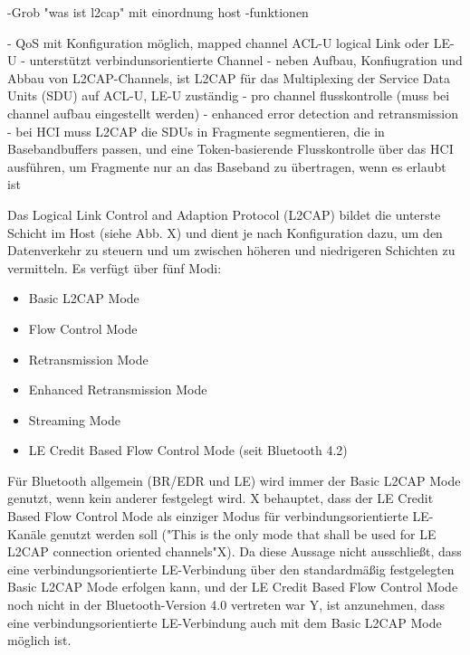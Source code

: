 -Grob "was ist l2cap" mit einordnung host
-funktionen

- QoS mit Konfiguration möglich, mapped channel ACL-U logical Link oder LE-U
- unterstützt verbindunsorientierte Channel
- neben Aufbau, Konfiugration und Abbau von L2CAP-Channels, ist L2CAP für das Multiplexing der Service Data Units (SDU) auf ACL-U, LE-U zuständig
- pro channel flusskontrolle (muss bei channel aufbau eingestellt werden)
- enhanced error detection and retransmission
- bei HCI muss L2CAP die SDUs in Fragmente segmentieren, die in Basebandbuffers passen, und eine Token-basierende Flusskontrolle über das HCI ausführen, um Fragmente nur an das Baseband zu übertragen, wenn es erlaubt ist

Das Logical Link Control and Adaption Protocol (L2CAP) bildet die unterste Schicht im Host (siehe Abb. X) 
und dient je nach Konfiguration dazu, um den Datenverkehr zu steuern und um zwischen höheren und niedrigeren Schichten zu vermitteln.
Es verfügt über fünf Modi:
\begin{itemize}
    \item Basic L2CAP Mode
    \item Flow Control Mode
    \item Retransmission Mode
    \item Enhanced Retransmission Mode
    \item Streaming Mode
    \item LE Credit Based Flow Control Mode (seit Bluetooth 4.2)
\end{itemize}
Für Bluetooth allgemein (BR/EDR und LE) wird immer der Basic L2CAP Mode genutzt, wenn kein anderer festgelegt wird. X behauptet, dass der LE Credit Based Flow Control Mode als einziger Modus für verbindungsorientierte LE-Kanäle genutzt werden soll ("This is the only mode that shall be used for LE L2CAP connection oriented channels"X). Da diese Aussage nicht ausschließt, dass eine verbindungsorientierte LE-Verbindung über den standardmäßig festgelegten Basic L2CAP Mode erfolgen kann, und der LE Credit Based Flow Control Mode noch nicht in der Bluetooth-Version 4.0 vertreten war Y, ist anzunehmen, dass eine verbindungsorientierte LE-Verbindung auch mit dem Basic L2CAP Mode möglich ist.

